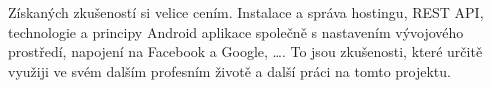 \documentclass[thesis=B,czech]{FITthesis}[2012/06/26]
\begin{document}
\begin{conclusion}
Získaných zkušeností si velice cením. Instalace a správa hostingu, REST API, technologie a principy Android aplikace společně s nastavením vývojového prostředí, napojení na Facebook a Google, \dots. To jsou zkušenosti, které určitě využiji ve svém dalším profesním životě a další práci na tomto projektu.
 

%
%
%
%
%

\end{conclusion}
\end{document}
